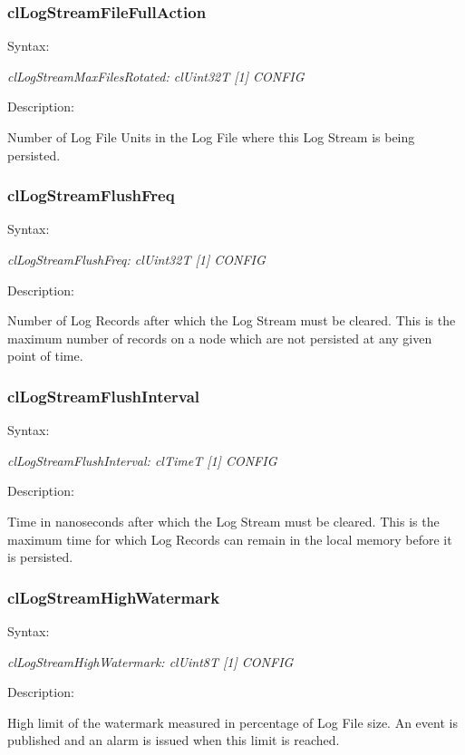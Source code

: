 \begin{flushleft}
\subsubsection{clLogStreamFileFullAction}
\begin{Desc}
\item[Syntax:]
\end{Desc}
\textit{clLogStreamMaxFilesRotated: clUint32T [1] {CONFIG}}
\begin{Desc}
 \item[Description:]
\end{Desc}
Number of Log File Units in the Log File where this Log Stream is being persisted.



\subsubsection{clLogStreamFlushFreq}
\begin{Desc}
\item[Syntax:]
\end{Desc}
\textit{clLogStreamFlushFreq: clUint32T [1] {CONFIG}}
\begin{Desc}
 \item[Description:]
\end{Desc}
Number of Log Records after which the Log Stream must be cleared. This is the maximum number of records on a node which are not persisted at any 
given point of time.


\subsubsection{clLogStreamFlushInterval}
\begin{Desc}
\item[Syntax:]
\end{Desc}
\textit{clLogStreamFlushInterval: clTimeT [1] {CONFIG}}
\begin{Desc}
 \item[Description:]
\end{Desc}
Time in nanoseconds after which the Log Stream must be cleared. This is the maximum time for which Log Records can remain in the local memory before
it is persisted.

\subsubsection{clLogStreamHighWatermark}
\begin{Desc}
\item[Syntax:]
\end{Desc}
\textit{clLogStreamHighWatermark: clUint8T [1] {CONFIG}}
\begin{Desc}
 \item[Description:]
\end{Desc}
High limit of the watermark measured in percentage of Log File size. An event is published and an alarm is issued when this limit is reached.


\end{flushleft}
